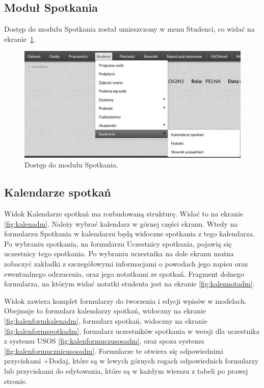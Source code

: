 \documentclass[licencjacka]{pracamgr}
\begin{document}
\subsection{Moduł Spotkania}
Dostęp do modułu Spotkania został umieszczony w menu Studenci, co widać na ekranie~\ref{fig:modspoadm}.

\begin{figure}[!]
  \includegraphics[width=\linewidth]{spotkaniaadm.jpg}
  \caption{Dostęp do modułu Spotkania.}
  \label{fig:modspoadm}
\end{figure}

\subsection{Kalendarze spotkań}
Widok Kalendarze spotkań ma rozbudowaną strukturę. Widać to na ekranie \ref{fig:kalenadm}. Należy wybrać kalendarz w górnej części ekranu. Wtedy na 
formularzu Spotkania w kalendarzu będą widoczne spotkania z tego kalendarza. Po wybraniu spotkania, na formularzu Uczestnicy spotkania, pojawią się 
uczestnicy tego spotkania. Po wybraniu uczestnika na dole ekranu można zobaczyć zakładki z szczegółowymi informacjami o powodach jego zapisu oraz 
ewentualnego odrzucenia, oraz jego notatkami ze spotkań. Fragment dolnego formularza, na którym widać notatki studenta jest na ekranie 
\ref{fig:kalennotadm}.

Widok zawiera komplet formularzy do tworzenia i edycji wpisów w modelach. Obejmuje to formularz kalendarzy spotkań, widoczny na ekranie 
\ref{fig:kalenformkalenadm}, formularz spotkań, widoczny na ekranie \ref{fig:kalenformspotkadm}, formularz uczestników spotkania w wersji dla uczestnika 
z systemu USOS \ref{fig:kalenformuczusosadm}, oraz spoza systemu \ref{fig:kalenformucznieusosadm}. Formularze te otwiera się odpowiednimi przyciskami 
\textsf{+Dodaj}, które są w lewych górnych rogach odpowiednich formularzy lub przyciskami do edytowania, które są w każdym wierszu z tabeli po prawej 
stronie.
\end{document}
